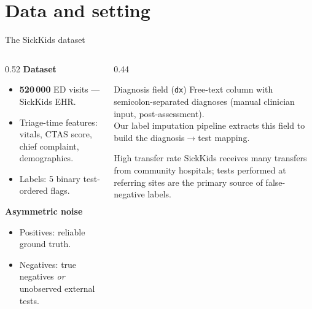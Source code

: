 \documentclass[aspectratio=169]{beamer}
\begin{document}
\section{Data and setting}

\begin{frame}{The SickKids dataset}
  \begin{columns}[T]
    \begin{column}{0.52\textwidth}
      \textbf{Dataset}
      \begin{itemize}
        \item \textbf{520\,000} ED visits --- SickKids EHR.
        \item Triage-time features: vitals, CTAS score,
              chief complaint, demographics.
        \item Labels: 5 binary test-ordered flags.
      \end{itemize}
      \vspace{0.5em}
      \textbf{Asymmetric noise}
      \begin{itemize}
        \item Positives: reliable ground truth.
        \item Negatives: true negatives \emph{or}
              unobserved external tests.
      \end{itemize}
    \end{column}
    \begin{column}{0.44\textwidth}
      \begin{block}{Diagnosis field (\texttt{dx})}
        \small
        Free-text column with semicolon-separated diagnoses
        (manual clinician input, post-assessment).\\[0.3em]
        Our label imputation pipeline extracts this field
        to build the diagnosis$\to$test mapping.
      \end{block}

      \vspace{0.4em}
      \begin{block}{High transfer rate}
        \small
        SickKids receives many transfers from community
        hospitals; tests performed at referring sites
        are the primary source of false-negative labels.
      \end{block}
    \end{column}
  \end{columns}
\end{frame}
\end{document}
